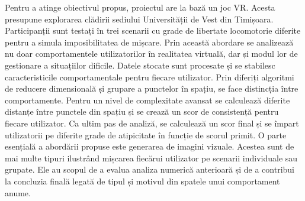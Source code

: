 \documentclass[12pt,a4paper]{report}
\theoremstyle{definition}
\theoremstyle{remark}
\begin{document}
Pentru a atinge obiectivul propus, proiectul are la bază un joc VR. Acesta presupune explorarea clădirii sediului Universității de Vest din Timișoara. Participanții sunt testați în trei scenarii cu grade de libertate locomotorie diferite pentru a simula imposibilitatea de mișcare. Prin această abordare se analizează nu doar comportamentele utilizatorilor în realitatea virtuală, dar și modul lor de gestionare a situațiilor dificile. Datele stocate sunt procesate și se stabilesc caracteristicile comportamentale pentru fiecare utilizator. Prin diferiți algoritmi de reducere dimensională și grupare a punctelor în spațiu, se face distincția între comportamente. Pentru un nivel de complexitate avansat se calculează diferite distanțe între punctele din spațiu și se crează un scor de consistență pentru fiecare utilizator. Ca ultim pas de analiză, se calculează un scor final și se împart utilizatorii pe diferite grade de atipicitate în funcție de scorul primit. O parte esențială a abordării propuse este generarea de imagini vizuale. Acestea sunt de mai multe tipuri ilustrând mișcarea fiecărui utilizator pe scenarii individuale sau grupate. Ele au scopul de a evalua analiza numerică anterioară și de a contribui la concluzia finală legată de tipul și motivul din spatele unui comportament anume.


\end{document}

